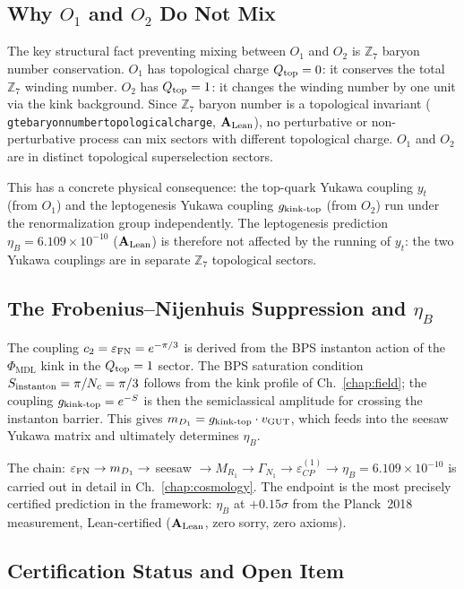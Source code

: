 \documentclass[11pt,openany]{book}
\theoremstyle{remark}
\newcommand{\PHIMDL}{\Phi_{\mathrm{MDL}}}
\newcommand{\ZS}{\mathbb{Z}_7}
\newcommand{\lean}[1]{%
  \penalty-100
  \begingroup\def\_{\textunderscore\allowbreak}\texttt{#1}\endgroup}
\newcommand{\Nc}{N_c}
\newcommand{\CatAL}{\ensuremath{\textbf{A}_{\rm Lean}}}
\begin{document}
\subsection*{Why $O_1$ and $O_2$ Do Not Mix}

The key structural fact preventing mixing between $O_1$ and $O_2$ is $\ZS$ baryon
number conservation.  $O_1$ has topological charge $Q_{\rm top} = 0$: it conserves
the total $\ZS$ winding number.  $O_2$ has $Q_{\rm top} = 1$: it changes the winding
number by one unit via the kink background.  Since $\ZS$ baryon number is a topological
invariant (\lean{gte\_baryon\_number\_topological\_charge}, \CatAL), no perturbative
or non-perturbative process can mix sectors with different topological charge.
$O_1$ and $O_2$ are in distinct topological superselection sectors.

This has a concrete physical consequence: the top-quark Yukawa coupling $y_t$ (from $O_1$)
and the leptogenesis Yukawa coupling $g_{\rm kink\text{-}top}$ (from $O_2$) run under
the renormalization group independently.  The leptogenesis prediction $\eta_B =
6.109\times10^{-10}$ (\CatAL) is therefore not affected by the running of $y_t$:
the two Yukawa couplings are in separate $\ZS$ topological sectors.

\subsection*{The Frobenius--Nijenhuis Suppression and $\eta_B$}

The coupling $c_2 = \varepsilon_{\rm FN} = e^{-\pi/3}$ is derived from the BPS
instanton action of the $\PHIMDL$ kink in the $Q_{\rm top}=1$ sector.  The BPS
saturation condition $S_{\rm instanton} = \pi/\Nc = \pi/3$ follows from the kink
profile of Ch.~\ref{chap:field}; the coupling $g_{\rm kink\text{-}top} = e^{-S}$
is then the semiclassical amplitude for crossing the instanton barrier.  This gives
$m_{D_1} = g_{\rm kink\text{-}top} \cdot v_{\rm GUT}$, which feeds into the seesaw
Yukawa matrix and ultimately determines $\eta_B$.

The chain: $\varepsilon_{\rm FN} \to m_{D_1} \to$ seesaw $\to M_{R_1} \to
\Gamma_{N_1} \to \varepsilon_{CP}^{(1)} \to \eta_B = 6.109\times10^{-10}$
is carried out in detail in Ch.~\ref{chap:cosmology}.  The endpoint is the most
precisely certified prediction in the framework: $\eta_B$ at $+0.15\sigma$
from the Planck~2018 measurement, Lean-certified (\CatAL, zero sorry, zero axioms).

\subsection*{Certification Status and Open Item}
\end{document}
